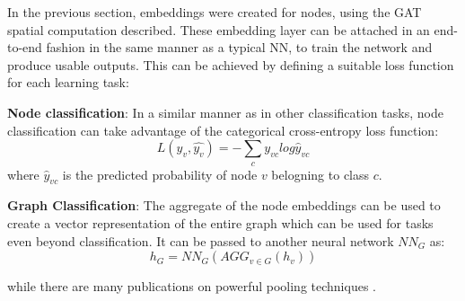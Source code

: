 In the previous section, embeddings were created for nodes, using the
GAT spatial computation described. These embedding layer can be attached
in an end-to-end fashion in the same manner as a typical NN, to train the
network and produce usable outputs. This can be achieved by defining a suitable
loss function for each learning task:

\textbf{Node classification}: In a similar manner as in other classification
tasks, node classification can take advantage of the categorical cross-entropy loss
function:
\begin{equation}
  \label{eq:categoricalCE}
  L(y_v,\hat{y_v}) = - \sum_c y_{vc} log\hat{y}_{vc}
\end{equation}
where $\hat{y}_{vc}$ is the predicted probability of node $v$ belogning to class $c$.

\textbf{Graph Classification}: The aggregate of the node embeddings can be
used to create a vector representation of the entire graph which can be used
for tasks even beyond classification. It can be passed to another neural
network $NN_G$ as:
\begin{equation*}
  h_G = NN_G(AGG_{v\in G}({h_v}))
\end{equation*}

while there are many publications on powerful pooling techniques \cite{
  zhang2018end, ying2018hierarchical, lee2019self
}.